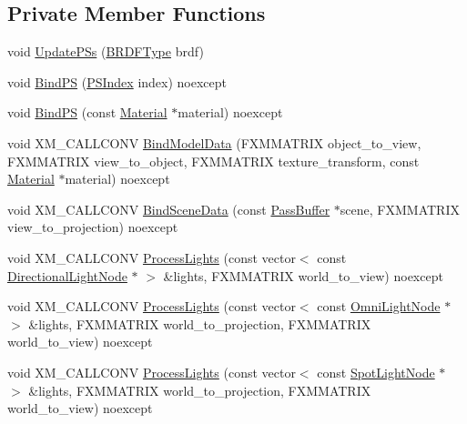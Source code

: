 \subsection*{Private Member Functions}
\begin{DoxyCompactItemize}
\item 
void \hyperlink{classmage_1_1_variable_shading_pass_a4e0a0e7709d99bb94f3263bdf478f484}{Update\+P\+Ss} (\hyperlink{namespacemage_ae7a7a03a7b34d7e2689689bb8295cd38}{B\+R\+D\+F\+Type} brdf)
\item 
void \hyperlink{classmage_1_1_variable_shading_pass_a9352c4b8b435254768c3407550458fb5}{Bind\+PS} (\hyperlink{classmage_1_1_variable_shading_pass_a49519e421ac5be93136d9efdbf075d4a}{P\+S\+Index} index) noexcept
\item 
void \hyperlink{classmage_1_1_variable_shading_pass_a0d7edd2336abc2791f93b180317f154f}{Bind\+PS} (const \hyperlink{structmage_1_1_material}{Material} $\ast$material) noexcept
\item 
void X\+M\+\_\+\+C\+A\+L\+L\+C\+O\+NV \hyperlink{classmage_1_1_variable_shading_pass_a4b86358d453ff6cf1c89b1b3894ab30f}{Bind\+Model\+Data} (F\+X\+M\+M\+A\+T\+R\+IX object\+\_\+to\+\_\+view, F\+X\+M\+M\+A\+T\+R\+IX view\+\_\+to\+\_\+object, F\+X\+M\+M\+A\+T\+R\+IX texture\+\_\+transform, const \hyperlink{structmage_1_1_material}{Material} $\ast$material) noexcept
\item 
void X\+M\+\_\+\+C\+A\+L\+L\+C\+O\+NV \hyperlink{classmage_1_1_variable_shading_pass_a66499b3073896eaee66738564222000d}{Bind\+Scene\+Data} (const \hyperlink{structmage_1_1_pass_buffer}{Pass\+Buffer} $\ast$scene, F\+X\+M\+M\+A\+T\+R\+IX view\+\_\+to\+\_\+projection) noexcept
\item 
void X\+M\+\_\+\+C\+A\+L\+L\+C\+O\+NV \hyperlink{classmage_1_1_variable_shading_pass_a757ad7a8aa305319ebb8a985acfa81b5}{Process\+Lights} (const vector$<$ const \hyperlink{namespacemage_a7637b5351fc0f66a10badd80ebb35899}{Directional\+Light\+Node} $\ast$ $>$ \&lights, F\+X\+M\+M\+A\+T\+R\+IX world\+\_\+to\+\_\+view) noexcept
\item 
void X\+M\+\_\+\+C\+A\+L\+L\+C\+O\+NV \hyperlink{classmage_1_1_variable_shading_pass_ad4a1cef19ec60875df40483f94b50e71}{Process\+Lights} (const vector$<$ const \hyperlink{namespacemage_a1724c6e6b6b5ba535cdd967cbbb4a669}{Omni\+Light\+Node} $\ast$ $>$ \&lights, F\+X\+M\+M\+A\+T\+R\+IX world\+\_\+to\+\_\+projection, F\+X\+M\+M\+A\+T\+R\+IX world\+\_\+to\+\_\+view) noexcept
\item 
void X\+M\+\_\+\+C\+A\+L\+L\+C\+O\+NV \hyperlink{classmage_1_1_variable_shading_pass_ad48cdb0fddfa895e44b4537a31578935}{Process\+Lights} (const vector$<$ const \hyperlink{namespacemage_aeed5dee4ff6c591eabb0e9114256df4a}{Spot\+Light\+Node} $\ast$ $>$ \&lights, F\+X\+M\+M\+A\+T\+R\+IX world\+\_\+to\+\_\+projection, F\+X\+M\+M\+A\+T\+R\+IX world\+\_\+to\+\_\+view) noexcept

\end{DoxyCompactItemize}
